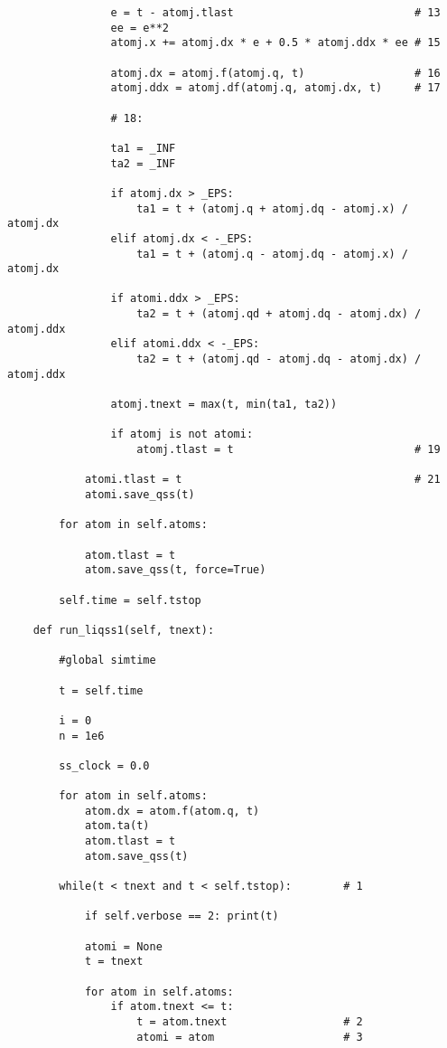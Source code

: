 \begin{lstlisting}
                e = t - atomj.tlast                            # 13
                ee = e**2
                atomj.x += atomj.dx * e + 0.5 * atomj.ddx * ee # 15

                atomj.dx = atomj.f(atomj.q, t)                 # 16
                atomj.ddx = atomj.df(atomj.q, atomj.dx, t)     # 17
                
                # 18:

                ta1 = _INF
                ta2 = _INF

                if atomj.dx > _EPS:
                    ta1 = t + (atomj.q + atomj.dq - atomj.x) / atomj.dx
                elif atomj.dx < -_EPS:
                    ta1 = t + (atomj.q - atomj.dq - atomj.x) / atomj.dx

                if atomi.ddx > _EPS:
                    ta2 = t + (atomj.qd + atomj.dq - atomj.dx) / atomj.ddx
                elif atomi.ddx < -_EPS:
                    ta2 = t + (atomj.qd - atomj.dq - atomj.dx) / atomj.ddx

                atomj.tnext = max(t, min(ta1, ta2))

                if atomj is not atomi:
                    atomj.tlast = t                            # 19

            atomi.tlast = t                                    # 21
            atomi.save_qss(t)

        for atom in self.atoms:

            atom.tlast = t
            atom.save_qss(t, force=True)

        self.time = self.tstop           

    def run_liqss1(self, tnext):

        #global simtime

        t = self.time

        i = 0
        n = 1e6

        ss_clock = 0.0

        for atom in self.atoms:
            atom.dx = atom.f(atom.q, t)
            atom.ta(t)
            atom.tlast = t
            atom.save_qss(t)

        while(t < tnext and t < self.tstop):        # 1

            if self.verbose == 2: print(t)

            atomi = None
            t = tnext

            for atom in self.atoms:
                if atom.tnext <= t:
                    t = atom.tnext                  # 2
                    atomi = atom                    # 3


\end{lstlisting}
